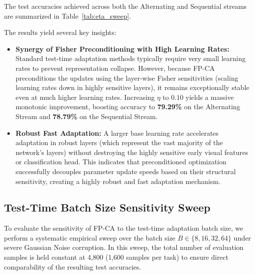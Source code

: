 \documentclass{article}
\theoremstyle{plain}
\theoremstyle{definition}
\theoremstyle{remark}
\begin{document}
The test accuracies achieved across both the Alternating and Sequential streams are summarized in Table~\ref{tab:eta_sweep}.

\begin{table}[h]
\centering
\caption{Sensitivity Analysis of Base Learning Rate $\eta$ (under Gaussian Noise)}
\label{tab:eta_sweep}
\vskip 0.1in
\begin{small}
\end{small}
\end{table}

The results yield several key insights:
\begin{itemize}
  \item \textbf{Synergy of Fisher Preconditioning with High Learning Rates:} Standard test-time adaptation methods typically require very small learning rates to prevent representation collapse. However, because FP-CA preconditions the updates using the layer-wise Fisher sensitivities (scaling learning rates down in highly sensitive layers), it remains exceptionally stable even at much higher learning rates. Increasing $\eta$ to $0.10$ yields a massive monotonic improvement, boosting accuracy to \textbf{79.29\%} on the Alternating Stream and \textbf{78.79\%} on the Sequential Stream.
  \item \textbf{Robust Fast Adaptation:} A larger base learning rate accelerates adaptation in robust layers (which represent the vast majority of the network's layers) without destroying the highly sensitive early visual features or classification head. This indicates that preconditioned optimization successfully decouples parameter update speeds based on their structural sensitivity, creating a highly robust and fast adaptation mechanism.
\end{itemize}

\subsection{Test-Time Batch Size Sensitivity Sweep}
To evaluate the sensitivity of FP-CA to the test-time adaptation batch size, we perform a systematic empirical sweep over the batch size $B \in \{8, 16, 32, 64\}$ under severe Gaussian Noise corruption. In this sweep, the total number of evaluation samples is held constant at 4,800 (1,600 samples per task) to ensure direct comparability of the resulting test accuracies. 
\end{document}

